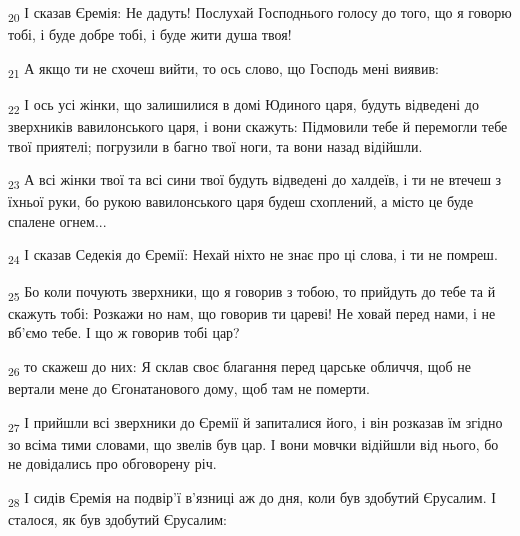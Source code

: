 \begin{tcolorbox}
\textsubscript{20} І сказав Єремія: Не дадуть! Послухай Господнього голосу до того, що я говорю тобі, і буде добре тобі, і буде жити душа твоя!
\end{tcolorbox}
\begin{tcolorbox}
\textsubscript{21} А якщо ти не схочеш вийти, то ось слово, що Господь мені виявив:
\end{tcolorbox}
\begin{tcolorbox}
\textsubscript{22} І ось усі жінки, що залишилися в домі Юдиного царя, будуть відведені до зверхників вавилонського царя, і вони скажуть: Підмовили тебе й перемогли тебе твої приятелі; погрузили в багно твої ноги, та вони назад відійшли.
\end{tcolorbox}
\begin{tcolorbox}
\textsubscript{23} А всі жінки твої та всі сини твої будуть відведені до халдеїв, і ти не втечеш з їхньої руки, бо рукою вавилонського царя будеш схоплений, а місто це буде спалене огнем...
\end{tcolorbox}
\begin{tcolorbox}
\textsubscript{24} І сказав Седекія до Єремії: Нехай ніхто не знає про ці слова, і ти не помреш.
\end{tcolorbox}
\begin{tcolorbox}
\textsubscript{25} Бо коли почують зверхники, що я говорив з тобою, то прийдуть до тебе та й скажуть тобі: Розкажи но нам, що говорив ти цареві! Не ховай перед нами, і не вб'ємо тебе. І що ж говорив тобі цар?
\end{tcolorbox}
\begin{tcolorbox}
\textsubscript{26} то скажеш до них: Я склав своє благання перед царське обличчя, щоб не вертали мене до Єгонатанового дому, щоб там не померти.
\end{tcolorbox}
\begin{tcolorbox}
\textsubscript{27} І прийшли всі зверхники до Єремії й запиталися його, і він розказав їм згідно зо всіма тими словами, що звелів був цар. І вони мовчки відійшли від нього, бо не довідались про обговорену річ.
\end{tcolorbox}
\begin{tcolorbox}
\textsubscript{28} І сидів Єремія на подвір'ї в'язниці аж до дня, коли був здобутий Єрусалим. І сталося, як був здобутий Єрусалим:
\end{tcolorbox}
